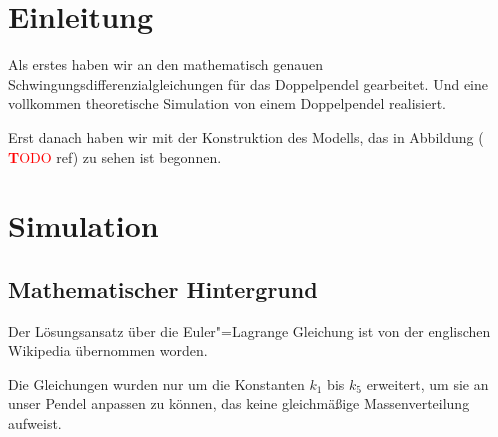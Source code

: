 \documentclass[a4paper, 10pt]{article}
\title{\mytitle}
\author{\myauthor}
\newcommand{\TODO}{\textcolor{red}{ \textbf TODO }}
\begin{document}
\maketitle
\begin{abstract}
In unserem Projekt beschäftigen wir uns mit dem Verhalten von chaotischen Doppelpendeln. Wir wollen aus der aktuellen Bewegung eines Doppelpendels den weiteren Bewegungsablauf in einem kurzen Zeitintervall extrapolieren und dann versuchen, diese Bewegung zu beeinflussen.

Hierzu wollen wir zunächst ein Doppelpendel konstruieren, bei dem Daten über den aktuellen Bewegungszustand erfasst werden können. Diese Daten sollen in Echtzeit von einem Computer ausgewertet werden, um laufend eine Prognose an die Messwerte anzupassen. Anhand dieser Prognose soll dann entschieden werden, ob das Pendel eine unerwünschte Bewegung durchführen wird, und wenn nötig, soll mithilfe mehrerer Spulen eine korrigierende magnetische Kraft erzeugt werden. Es könnte zum Beispiel erwünscht sein, einen Überschlag zu vermeiden.
\end{abstract}

\newpage
\pagestyle{fancy}
\tableofcontents

\newpage

\section{Einleitung}
Als erstes haben wir an den mathematisch genauen Schwingungsdifferenzialgleichungen für das Doppelpendel gearbeitet.
Und eine vollkommen theoretische Simulation von einem Doppelpendel realisiert.

Erst danach haben wir mit der Konstruktion des Modells, das in Abbildung (\TODO ref) zu sehen ist begonnen.

\section{Simulation}

\subsection{Mathematischer Hintergrund}

Der Lösungsansatz über die Euler"=Lagrange Gleichung ist von der englischen Wikipedia übernommen worden.
\citep{wikidoublependulum}

Die Gleichungen wurden nur um die Konstanten $k_1$ bis $k_5$ erweitert, um sie an unser Pendel anpassen zu können, das keine gleichmäßige Massenverteilung aufweist.
\end{document}
